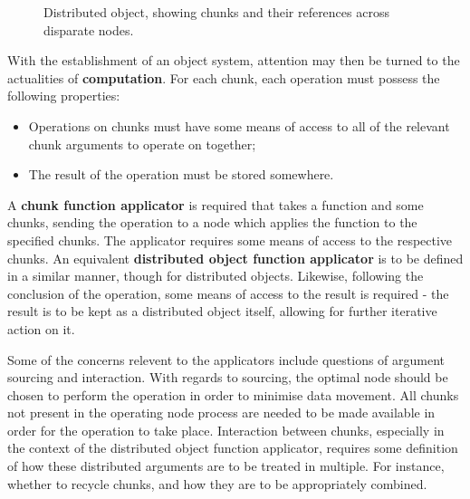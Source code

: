 \documentclass[letterpaper, inpress]{jds} %
\begin{document}
\begin{figure}[ht]
\begin{center}
    
\caption{Distributed object, showing chunks and their references across disparate nodes.}
\label{fig:distobj}
\end{center}
\end{figure}

With the establishment of an object system, attention may then be turned to the actualities of \textbf{computation}. 
For each chunk, each operation must possess the following properties:

\begin{itemize}
    \item Operations on chunks must have some means of access to all of the relevant chunk arguments to operate on together;
    \item The result of the operation must be stored somewhere.
\end{itemize}

A \textbf{chunk function applicator} is required that takes a function and some chunks, sending the operation to a node which applies the function to the specified chunks.
The applicator requires some means of access to the respective chunks.
An equivalent \textbf{distributed object function applicator} is to be defined in a similar manner, though for distributed objects.
Likewise, following the conclusion of the operation, some means of access to the result is required - the result is to be kept as a distributed object itself, allowing for further iterative action on it.

Some of the concerns relevent to the applicators include questions of argument sourcing and interaction.
With regards to sourcing, the optimal node should be chosen to perform the operation in order to minimise data movement.
All chunks not present in the operating node process are needed to be made available in order for the operation to take place.
Interaction between chunks, especially in the context of the distributed object function applicator, requires some definition of how these distributed arguments are to be treated in multiple.
For instance, whether to recycle chunks, and how they are to be appropriately combined.
\end{document}

